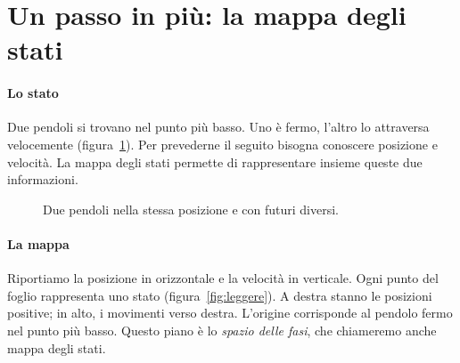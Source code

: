 \documentclass[11pt]{article}
\begin{document}
\section{Un passo in più: la mappa degli stati}\label{sec:mappa}

\paragraph{Lo stato} Due pendoli si trovano nel punto più basso. Uno è fermo, l'altro lo attraversa velocemente (figura~\ref{fig:velocita}). Per prevederne il seguito bisogna conoscere posizione e velocità. La mappa degli stati permette di rappresentare insieme queste due informazioni.

\begin{figure}[htbp]
\centering
{}
\caption{Due pendoli nella stessa posizione e con futuri diversi.}
\label{fig:velocita}
\end{figure}

\paragraph{La mappa} Riportiamo la posizione in orizzontale e la velocità in verticale. Ogni punto del foglio rappresenta uno stato (figura~\ref{fig:leggere}). A destra stanno le posizioni positive; in alto, i movimenti verso destra. L'origine corrisponde al pendolo fermo nel punto più basso. Questo piano è lo \emph{spazio delle fasi}, che chiameremo anche mappa degli stati.
\end{document}
